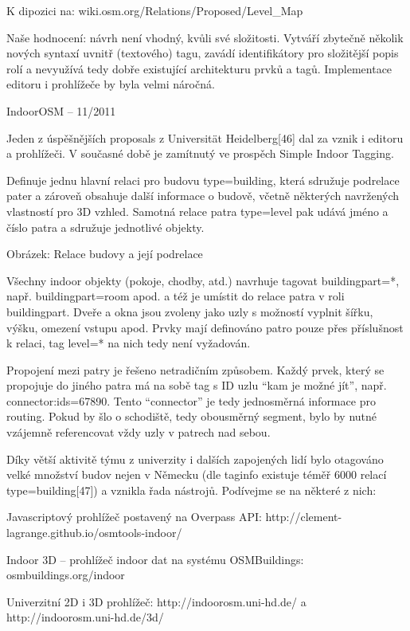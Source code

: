 K dipozici na: wiki.osm.org/Relations/Proposed/Level\_Map

Naše hodnocení: návrh není vhodný, kvůli své složitosti. Vytváří zbytečně několik nových syntaxí uvnitř (textového) tagu, zavádí identifikátory pro složitější popis rolí a nevyužívá tedy dobře existující architekturu prvků a tagů. Implementace editoru i prohlížeče by byla velmi náročná.

IndoorOSM – 11/2011



Jeden z úspěšnějších proposals z Universität Heidelberg[46] dal za vznik i editoru a prohlížeči. V současné době je zamítnutý ve prospěch Simple Indoor Tagging.

Definuje jednu hlavní relaci pro budovu type=building, která sdružuje podrelace pater a zároveň obsahuje další informace o budově, včetně některých navržených vlastností pro 3D vzhled. Samotná relace patra type=level pak udává jméno a číslo patra a sdružuje jednotlivé objekty.



Obrázek: Relace budovy a její podrelace

Všechny indoor objekty (pokoje, chodby, atd.) navrhuje tagovat buildingpart=*, např. buildingpart=room apod. a též je umístit do relace patra v roli buildingpart. Dveře a okna jsou zvoleny jako uzly s možností vyplnit šířku, výšku, omezení vstupu apod. Prvky mají definováno patro pouze přes příslušnost k relaci, tag level=* na nich tedy není vyžadován.

Propojení mezi patry je řešeno netradičním způsobem. Každý prvek, který se propojuje do jiného patra má na sobě tag s ID uzlu “kam je možné jít”, např. connector:ids=67890. Tento “connector” je tedy jednosměrná informace pro routing. Pokud by šlo o schodiště, tedy obousměrný segment, bylo by nutné vzájemně referencovat vždy uzly v patrech nad sebou.

Díky větší aktivitě týmu z univerzity i dalších zapojených lidí bylo otagováno velké množství budov nejen v Německu (dle taginfo existuje téměř 6000 relací type=building[47]) a vznikla řada nástrojů. Podívejme se na některé z nich:

Javascriptový prohlížeč postavený na Overpass API: http://clement-lagrange.github.io/osmtools-indoor/ 

Indoor 3D – prohlížeč indoor dat na systému OSMBuildings: osmbuildings.org/indoor

Univerzitní 2D i 3D prohlížeč: http://indoorosm.uni-hd.de/ a http://indoorosm.uni-hd.de/3d/ 


